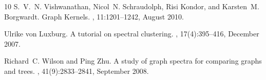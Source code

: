 \documentclass{amsart}
\begin{document}
\begin{thebibliography}{10}
S.~V.~N. Vishwanathan, Nicol~N. Schraudolph, Risi Kondor, and Karsten~M.
  Borgwardt.
\newblock Graph {Kernels}.
, 11:1201--1242, August 2010.

Ulrike von Luxburg.
\newblock A tutorial on spectral clustering.
, 17(4):395--416, December 2007.

Richard~C. Wilson and Ping Zhu.
\newblock A study of graph spectra for comparing graphs and trees.
, 41(9):2833--2841, September 2008.

\end{thebibliography}
\end{document}
